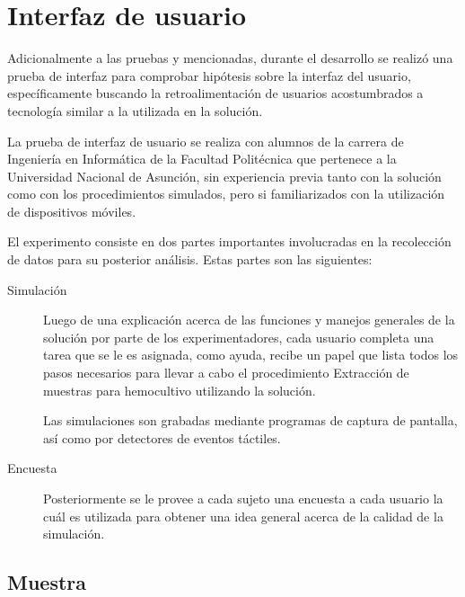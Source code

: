 \section{Interfaz de usuario}


Adicionalmente a las pruebas y mencionadas, durante el desarrollo se realizó una
prueba de interfaz para comprobar hipótesis sobre la interfaz del usuario,
específicamente buscando la retroalimentación de usuarios acostumbrados a
tecnología similar a la utilizada en la solución.

La prueba de interfaz de usuario se realiza con alumnos de la carrera de
Ingeniería en Informática de la Facultad Politécnica que pertenece a la
Universidad Nacional de Asunción, sin experiencia
previa tanto con la solución como con los procedimientos simulados, pero si
familiarizados con la utilización de dispositivos móviles.

El experimento consiste en dos partes importantes involucradas en la recolección
de datos para su posterior análisis. Estas partes son las siguientes:

\begin{description}

\item[Simulación] Luego de una explicación acerca de las funciones y manejos
    generales de la solución por parte de los experimentadores, cada usuario
    completa una tarea que se le es asignada, como ayuda, recibe un papel que
    lista todos los pasos necesarios para llevar a cabo el procedimiento
    Extracción de muestras para hemocultivo utilizando la solución.
    	
    Las simulaciones son grabadas mediante programas de captura de pantalla, así
    como por detectores de eventos táctiles.
    	
\item[Encuesta] Posteriormente se le provee a cada sujeto una encuesta a cada
    usuario la cuál es utilizada para obtener una idea general acerca de la
    calidad de la simulación. 

\end{description} 

\subsection{Muestra}


